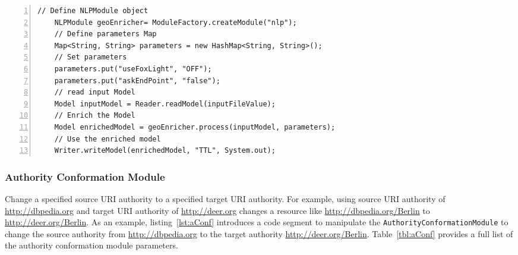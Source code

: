 \documentclass[a4paper,twoside,bibtotoc,abstracton,12pt,BCOR=15mm]{article}
\begin{document}
\begin{table}
\begin{tabularx}{\textwidth}{@{}lX@{}}
    \midrule
    \end{tabularx}
    \end{table}

    \begin{lstlisting}[label=lst:NLPModule, float=tp, numbers=left, numberstyle=\tiny, caption = Code fragment to call the \texttt{NLPModule} class.]
    // Define NLPModule object
    NLPModule geoEnricher= ModuleFactory.createModule("nlp");
    // Define parameters Map
    Map<String, String> parameters = new HashMap<String, String>();
    // Set parameters
    parameters.put("useFoxLight", "OFF");
    parameters.put("askEndPoint", "false");
    // read input Model
    Model inputModel = Reader.readModel(inputFileValue);
    // Enrich the Model
    Model enrichedModel = geoEnricher.process(inputModel, parameters);
    // Use the enriched model
    Writer.writeModel(enrichedModel, "TTL", System.out);
    \end{lstlisting}
    

\subsubsection{Authority Conformation Module}
    Change a specified source URI authority to a specified target URI authority.
    For example, using source URI authority of \url{http://dbpedia.org} and target URI authority of \url{http://deer.org} changes a resource like \url{http://dbpedia.org/Berlin} to \url{http://deer.org/Berlin}.
    As an example, listing~\ref{lst:aConf} introduces a code segment to manipulate the \texttt{AuthorityConformationModule} to change the source authority from \url{http://dbpedia.org} to the target authority \url{http://deer.org/Berlin}.
    Table~\ref{tbl:aConf} provides a full list of the authority conformation module parameters.
    
\end{document}
